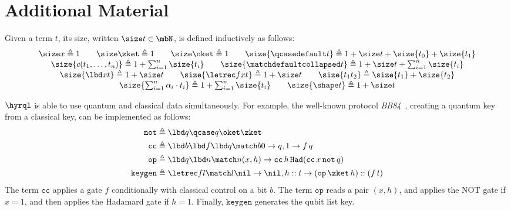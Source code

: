\section{Additional Material}
\label{app:additional}

\begin{definition}
  \label{def:size}
  Given a term $t$, its size, written $\size t \in \mbN$, is defined
  inductively as follows:
  \begingroup
  \renewcommand{\arraystretch}{1.5}
  \[
    \begin{array}{c}
      \size x \triangleq 1
      \qquad
      \size \zket \triangleq 1
      \qquad
      \size \oket \triangleq 1
      \qquad
      \size{\qcasedefault t} \triangleq 1 + \size t + \size{t_0} + \size{t_1} \\
      \size{c(t_1, \dots, t_n)} \triangleq 1 + \sum_{i=1}^n \size{t_i}
      \qquad
      \size{\matchdefaultcollapsed t} \triangleq 1 + \size t +
      \sum_{i=1}^n \size{t_i} \\
      \size{\lbd x t} \triangleq 1 + \size t
      \qquad
      \size{\letrec f x t} \triangleq 1 + \size t
      \qquad
      \size{t_1t_2} \triangleq \size{t_1} + \size{t_2}
      \\
      \size{\sum_{i=1}^n \alpha_i \cdot t_i} \triangleq 1 + \sum_{i=1}^n \size{t_i}
      \qquad
      \size{\shape t} \triangleq 1 + \size t
    \end{array}
  \]
  \endgroup
\end{definition}

\begin{example}
  \label{ex:hybrid-function}
  $\hyrql$ is able to use quantum and classical data simultaneously.
  For example, the well-known protocol \emph{BB84}~\cite{BB84}, creating
  a quantum key from a classical key, can be implemented as follows:
  \[
    \begin{aligned}
      \mathtt{not}&\triangleq \lbd q \qcase q \oket \zket \\
      \mathtt{cc} &\triangleq \lbd b \lbd f \lbd q \match b {
        0 \to q,
        1 \to f\,q
      } \\
      \mathtt{op} &\triangleq \lbd q \lbd n \match n {
        (x, h) \to
        \mathtt{cc}\,h\,\mathtt{Had}(\mathtt{cc}\,x\,\mathtt{not}\,q)
      } \\
      \mathtt{keygen} &\triangleq  \letrec f  l \match l {
        \nil \to \nil,
        h::t \to (\mathtt{op}\,\zket\,h) :: (f\,t)
      }
    \end{aligned}
  \]
  The term $\mathtt{cc}$ applies a gate $f$ conditionally with classical
  control on a bit $b$.
  The term $\mathtt{op}$ reads a pair $(x, h)$, and applies the NOT gate if
  $x = 1$, and then applies the Hadamard gate if $h = 1$. Finally,
  $\mathtt{keygen}$ generates the qubit list key.
\end{example}


